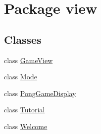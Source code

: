 \hypertarget{namespaceview}{}\section{Package view}
\label{namespaceview}
\subsection*{Classes}
\begin{DoxyCompactItemize}
\item 
class \hyperlink{classview_1_1_game_view}{Game\+View}
\item 
class \hyperlink{classview_1_1_mode}{Mode}
\item 
class \hyperlink{classview_1_1_pong_game_display}{Pong\+Game\+Display}
\item 
class \hyperlink{classview_1_1_tutorial}{Tutorial}
\item 
class \hyperlink{classview_1_1_welcome}{Welcome}
\end{DoxyCompactItemize}
